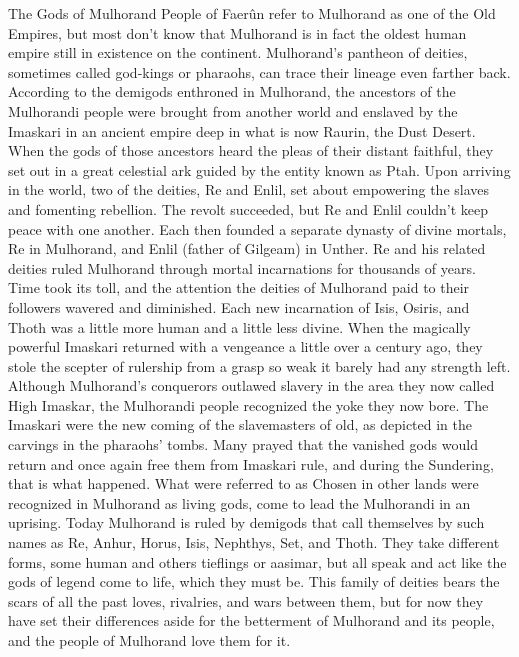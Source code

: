 \documentclass[10pt,a4paper,twoside,twocolumn,openany,bg=print,nodeprecatedcode]{dndbook}
\begin{document}
\begin{DndComment}{The Gods of Mulhorand}
People of Faerûn refer to Mulhorand as one of the Old Empires, but most don't know that Mulhorand is in fact the oldest human empire still in existence on the continent. Mulhorand's pantheon of deities, sometimes called god-kings or pharaohs, can trace their lineage even farther back.
According to the demigods enthroned in Mulhorand, the ancestors of the Mulhorandi people were brought from another world and enslaved by the Imaskari in an ancient empire deep in what is now Raurin, the Dust Desert. When the gods of those ancestors heard the pleas of their distant faithful, they set out in a great celestial ark guided by the entity known as Ptah. Upon arriving in the world, two of the deities, Re and Enlil, set about empowering the slaves and fomenting rebellion.
The revolt succeeded, but Re and Enlil couldn't keep peace with one another. Each then founded a separate dynasty of divine mortals, Re in Mulhorand, and Enlil (father of Gilgeam) in Unther. Re and his related deities ruled Mulhorand through mortal incarnations for thousands of years.
Time took its toll, and the attention the deities of Mulhorand paid to their followers wavered and diminished. Each new incarnation of Isis, Osiris, and Thoth was a little more human and a little less divine. When the magically powerful Imaskari returned with a vengeance a little over a century ago, they stole the scepter of rulership from a grasp so weak it barely had any strength left.
Although Mulhorand's conquerors outlawed slavery in the area they now called High Imaskar, the Mulhorandi people recognized the yoke they now bore. The Imaskari were the new coming of the slavemasters of old, as depicted in the carvings in the pharaohs' tombs. Many prayed that the vanished gods would return and once again free them from Imaskari rule, and during the Sundering, that is what happened. What were referred to as Chosen in other lands were recognized in Mulhorand as living gods, come to lead the Mulhorandi in an uprising.
Today Mulhorand is ruled by demigods that call themselves by such names as Re, Anhur, Horus, Isis, Nephthys, Set, and Thoth. They take different forms, some human and others tieflings or aasimar, but all speak and act like the gods of legend come to life, which they must be. This family of deities bears the scars of all the past loves, rivalries, and wars between them, but for now they have set their differences aside for the betterment of Mulhorand and its people, and the people of Mulhorand love them for it.
\end{DndComment}
\end{document}
